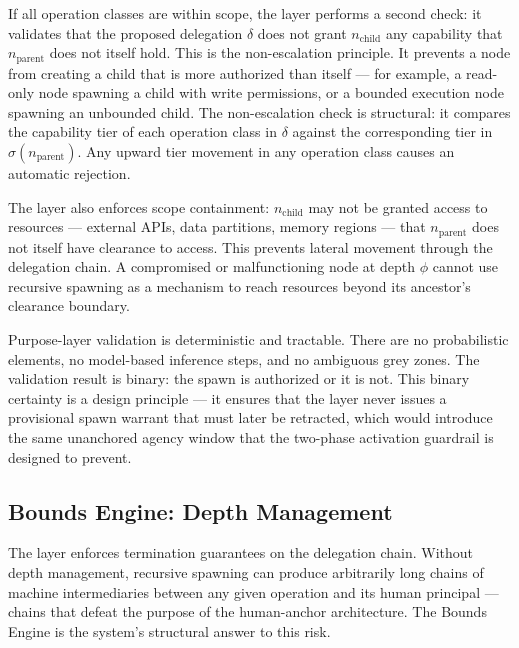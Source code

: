 If all operation classes are within scope, the \purpose{} layer performs a second check: it validates that the proposed delegation $\delta$ does not grant $n_{\text{child}}$ any capability that $n_{\text{parent}}$ does not itself hold. This is the non-escalation principle. It prevents a node from creating a child that is more authorized than itself — for example, a read-only node spawning a child with write permissions, or a bounded execution node spawning an unbounded child. The non-escalation check is structural: it compares the capability tier of each operation class in $\delta$ against the corresponding tier in $\sigma(n_{\text{parent}})$. Any upward tier movement in any operation class causes an automatic rejection.

The \purpose{} layer also enforces scope containment: $n_{\text{child}}$ may not be granted access to resources — external APIs, data partitions, memory regions — that $n_{\text{parent}}$ does not itself have clearance to access. This prevents lateral movement through the delegation chain. A compromised or malfunctioning node at depth $\phi$ cannot use recursive spawning as a mechanism to reach resources beyond its ancestor's clearance boundary.

Purpose-layer validation is deterministic and tractable. There are no probabilistic elements, no model-based inference steps, and no ambiguous grey zones. The validation result is binary: the spawn is authorized or it is not. This binary certainty is a design principle — it ensures that the \purpose{} layer never issues a provisional spawn warrant that must later be retracted, which would introduce the same unanchored agency window that the two-phase activation guardrail is designed to prevent.

\subsection{Bounds Engine: Depth Management}\label{sec:depth-management}

The \bounds{} layer enforces termination guarantees on the delegation chain. Without depth management, recursive spawning can produce arbitrarily long chains of machine intermediaries between any given operation and its human principal — chains that defeat the purpose of the human-anchor architecture. The Bounds Engine is the \bxthree{} system's structural answer to this risk.


